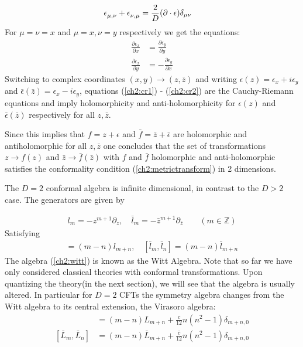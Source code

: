   \begin{align}
   \tensor[]{\epsilon}{_\mu_{,\nu}}+\tensor[]{\epsilon}{_\nu_{,\mu}} &= \frac{2}{D}(\partial \cdot \epsilon) \delta_{\mu\nu}
  \end{align}
  For $\mu =\nu =x$ and $\mu=x,\nu=y$ respectively we get the equations:
  \begin{align}
   \frac{\partial \epsilon_x}{\partial x} &= \frac{\partial \epsilon_y}{\partial y} \label{ch2:cr1}\\
   \frac{\partial \epsilon_x}{\partial y} &= -\frac{\partial \epsilon_y}{\partial x} \label{ch2:cr2}
   \end{align}
  Switching to complex coordinates $(x,y) \to (z,\bar{z})$ and writing $\epsilon(z)=\epsilon_x+i\epsilon_y$ and $\bar \epsilon(\bar{z})=\epsilon_x-i\epsilon_y$, equations (\ref{ch2:cr1}) - (\ref{ch2:cr2}) are the Cauchy-Riemann equations and imply holomorphicity and anti-holomorphicity for $\epsilon(z)$ and  $\bar \epsilon(\bar{z})$ respectively for all $z,\bar z$. 
  
  Since this implies that $f=z+\epsilon$ and $\bar f = \bar z +\bar \epsilon$ are holomorphic and antiholomorphic for all $z,\bar z$ one concludes that the set of transformations $z \to f(z)$ and  $\bar z \to \bar f(\bar z)$ with $f$ and $\bar f$ holomorphic and anti-holomorphic satisfies the conformality condition (\ref{ch2:metrictransform}) in 2 dimensions.
  
  The $D=2$ conformal algebra is infinite dimensional, in contrast to the $D>2$ case. The generators are given by
  
  \begin{align}
   l_m = -z^{m+1}\partial_z, \quad \bar{l}_m = -\bar{z}^{m+1} \partial_{\bar{z}} \qquad (m \in \mathbb{Z})
  \end{align}
  Satisfying 
  \begin{align}
   [l_m,l_n] =(m-n) l_{m+n}, \quad [\bar{l}_m,\bar{l}_n] =(m-n) \bar{l}_{m+n} \label{ch2:witt}
  \end{align}
  The algebra (\ref{ch2:witt}) is known as the Witt Algebra. Note that so far we have only considered classical theories with conformal transformations. Upon quantizing the theory(in the next section), we will see that the algebra is usually altered. In particular for $D=2$ CFTs the symmetry algebra changes from the Witt algebra to its central extension, the Virasoro algebra:
  \begin{align}
   [L_m,L_n] &= (m-n)L_{m+n} + \frac{c}{12}n(n^2-1)\delta_{m+n,0} \\
   [\bar{L}_m,\bar{L}_n] &= (m-n)\bar{L}_{m+n} + \frac{\bar c}{12}n(n^2-1)\delta_{m+n,0} 
  \end{align}
  

